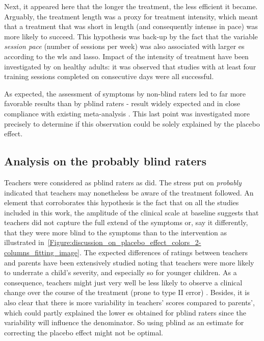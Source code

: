 Next, it appeared here that the longer the treatment, the less efficient it became. Arguably, the treatment length was a
proxy for treatment intensity, which meant that a treatment that was short in length (and consequently intense in pace)
was more likely to succeed. This hypothesis was back-up by the fact that the variable \emph{session pace} (number of
sessions per week) was also associated with larger \gls{es} according to the \gls{wls} and \gls{lasso}. Impact of the
intensity of treatment have been investigated by \citep{Rogala2016} on healthy adults: it was observed that studies with
at least four training sessions completed on consecutive days were all successful. 

As expected, the assessment of symptoms by non-blind raters led to far more favorable results than by \gls{pblind} raters -
result widely expected and in close compliance with existing meta-analysis \citep{Cortese2016, Micoulaud2014}. This last point
was investigated more precisely to determine if this observation could be solely explained by the placebo effect. 


\subsection{Analysis on the probably blind raters}

Teachers were considered as \gls{pblind} raters as \citeauthor{Cortese2016,Micoulaud2014} did. 
The stress put on \emph{probably} indicated that teachers may nonetheless be aware of the treatment followed. 
An element that corroborates this hypothesis is the fact that on all the studies included in this work, the amplitude 
of the clinical scale at baseline suggests that teachers did not capture the full extend of the symptoms or, say it differently, 
that they were more blind to the symptoms than to the intervention as illustrated 
in~\ref{Figure:discussion_on_placebo_effect_colors_2-columns_fitting_image}. The expected differences of ratings between 
teachers and parents have been extensively studied \citep{Sollie2013, Narad2015, Minder2018} noting that teachers were more 
likely to underrate a child's severity, and especially so for younger children. As a consequence, teachers might just very 
well be less likely to observe a clinical change over the course of the treatment (prone to type II error) 
\citep{Sollie2013, Narad2015, Minder2018}. Besides, it is also clear that there is more variability in teachers' scores compared 
to parents', which could partly explained the lower \gls{es} obtained for \gls{pblind} raters since the variability will influence 
the denominator. So using \gls{pblind} as an estimate for correcting the placebo effect might not be optimal.

